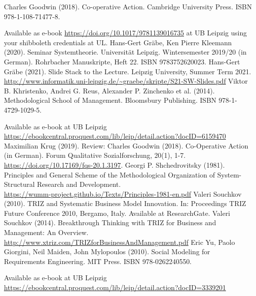 \documentclass[11pt,a4paper]{article}
\begin{document}
\begin{thebibliography}{xxx}
 Charles Goodwin (2018). Co-operative Action.  Cambridge
  University Press. ISBN 978-1-108-71477-8.
  
  Available as e-book \url{https://doi.org/10.1017/9781139016735} at UB
  Leipzig using your shibboleth credentials at UL.
 Hans-Gert Gräbe, Ken Pierre Kleemann (2020). Seminar
  Systemtheorie. Universität Leipzig. Wintersemester 2019/20 (in German).
  Rohrbacher Manuskripte, Heft 22. ISBN 9783752620023.
 Hans-Gert Gräbe (2021). Slide Stack to the Lecture.
  Leipzig University, Summer Term 2021.\\
  \url{http://www.informatik.uni-leipzig.de/~graebe/skripte/S21-SW-Slides.pdf}
 Viktor B. Khristenko, Andrei G. Reus, Alexander
  P. Zinchenko et al. (2014). Methodological School of Management. Bloomsbury
  Publishing.  ISBN 978-1-4729-1029-5.

  Available as e-book at UB Leipzig\\
  \url{https://ebookcentral.proquest.com/lib/leip/detail.action?docID=6159470}
 Maximilian Krug (2019). Review: Charles Goodwin (2018).
  Co-Operative Action (in German). Forum Qualitative Sozialforschung, 20(1),
  1-7.  \\ \url{https://doi.org/10.17169/fqs-20.1.3197}.
 Georgi P. Shchedrovitsky (1981). Principles and
  General Scheme of the Methodological Organization of System-Structural
  Research and Development.  \\
  \url{https://wumm-project.github.io/Texts/Principles-1981-en.pdf}
 Valeri Souchkov (2010).  TRIZ and Systematic Business
  Model Innovation.  In: Proceedings TRIZ Future Conference 2010, Bergamo,
  Italy.   Available at ResearchGate.
 Valeri Souchkov (2014).  Breakthrough Thinking with
  TRIZ for Business and Management: An Overview.
  \url{http://www.xtriz.com/TRIZforBusinessAndManagement.pdf}
 Eric Yu, Paolo Giorgini, Neil Maiden, John Mylopoulos (2010).
  Social Modeling for Requirements Engineering. MIT Press.  ISBN
  978-0262240550.
  
  Available as e-book at UB Leipzig\\
  \url{https://ebookcentral.proquest.com/lib/leip/detail.action?docID=3339201}
\end{thebibliography}
\end{document}
